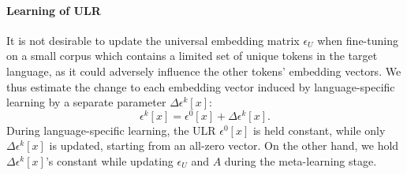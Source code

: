 \paragraph{Learning of ULR}

It is not desirable to update the universal embedding matrix $\epsilon_U$ when fine-tuning on a small corpus which contains a limited set of unique tokens in the target language, as it could adversely influence the other tokens' embedding vectors. We thus estimate the change to each embedding vector induced by language-specific learning by a separate parameter $\Delta \epsilon^k[x]$:
\begin{equation}
	\epsilon^k[x] = \epsilon^0[x] + \Delta \epsilon^k[x].
\end{equation}
During language-specific learning, the ULR $\epsilon^0[x]$ is held constant, while only $\Delta \epsilon^k[x]$ is updated, starting from an all-zero vector. On the other hand, we hold $\Delta \epsilon^k[x]$'s constant while updating $\epsilon_U$ and $A$ during the meta-learning stage. 




